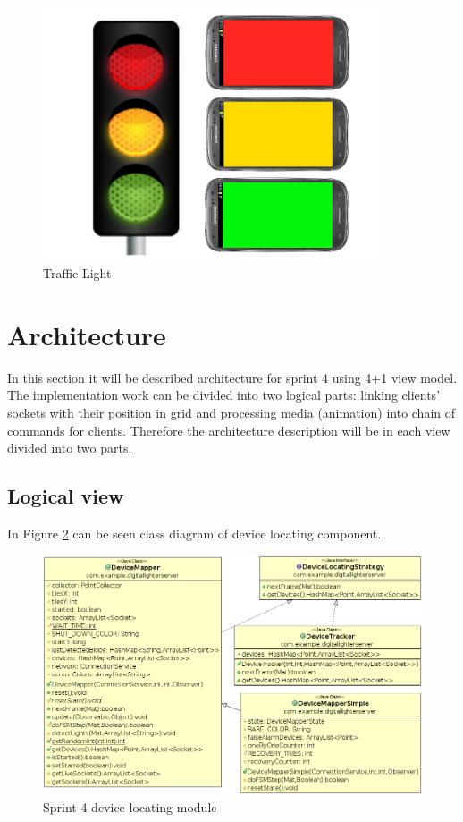 \begin{figure}[H]
	\centering
		\includegraphics[width=10cm]{sprint4/trafficlight.png}
	\caption{Traffic Light}
	\label{fig:trafficlight}
\end{figure}

\section{Architecture}
In this section it will be described architecture for sprint 4 using 4+1 view model.
The implementation work can be divided into two logical parts: linking clients' sockets with their position in grid and processing media (animation) into chain of commands for clients.
Therefore the architecture description will be in each view divided into two parts.

\subsection{Logical view}
In Figure \ref{fig:class_diagram_device_sprint4} can be seen class diagram of device locating component.
\begin{figure}[H]
	\centering
		\includegraphics[width=16.2cm]{sprint4/class_diagram_device.png}
	\caption{Sprint 4 device locating module}
	\label{fig:class_diagram_device_sprint4}
\end{figure}


